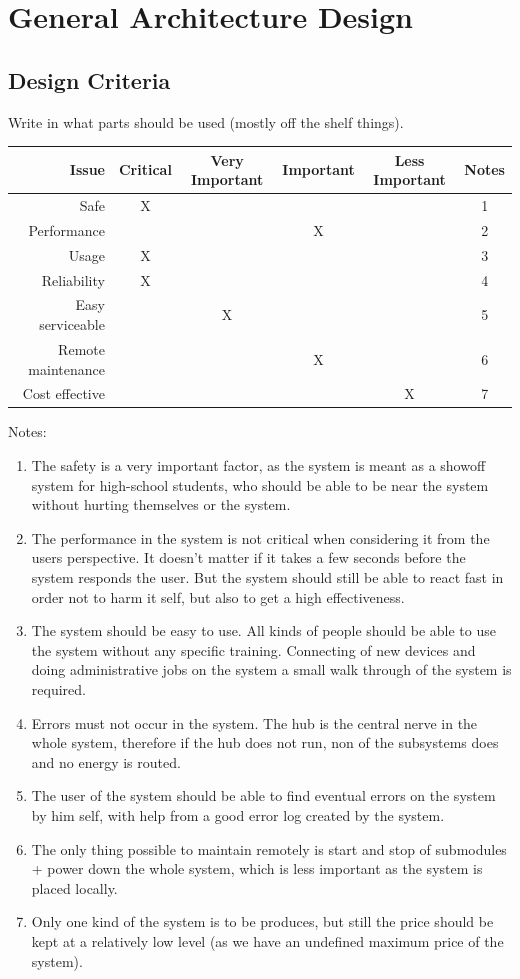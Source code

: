 \section{General Architecture Design}
	\subsection{Design Criteria}
		Write in what parts should be used (mostly off the shelf things).
				\begin{table}[H]
					\begin{tabular}{| r | c | c | c | c | c |}
					\hline
					Issue & Critical & Very Important & Important & Less Important & Notes \\ \hline
					Safe					& X & ~ & ~ & ~ & 1 \\ \hline
					Performance 			& ~ & ~ & X & ~ & 2 \\ \hline
					Usage 				& X & ~ & ~ & ~ & 3 \\ \hline
					Reliability 			& X & ~ & ~ & ~ & 4 \\ \hline
					Easy serviceable 		& ~ & X & ~ & ~ & 5 \\ \hline
					Remote maintenance 	& ~ & ~ & X & ~ & 6 \\ \hline
					Cost effective 			& ~ & ~ & ~ & X & 7 \\ \hline
					\end{tabular}
				\end{table}
			Notes:
			\begin{enumerate}
			\item The safety is a very important factor, as the system is meant as a showoff system for high-school students, who should
			be able to be near the system without hurting themselves or the system.
			\item The performance in the system is not critical when considering it from the users perspective. It doesn't matter if it takes a few seconds before the system responds the user.
			But the system should still be able to react fast in order not to harm it self, but also to get a high effectiveness. 
			\item The system should be easy to use. All kinds of people should be able to use the system without any specific training.
			Connecting of new devices and doing administrative jobs on the system a small walk through of the system is required. 
			\item Errors must not occur in the system. The hub is the central nerve in the whole system, therefore if the hub does not run, non of the subsystems does and no energy is routed.
			\item The user of the system should be able to find eventual errors on the system by him self, with help from a good error log created by the system.
			\item The only thing possible to maintain remotely is start and stop of submodules + power down the whole system, which is less important as the system is placed locally.
			\item Only one kind of the system is to be produces, but still the price should be kept at a relatively low level (as we have an undefined maximum price of the system).
			\end{enumerate}
	\newpage
